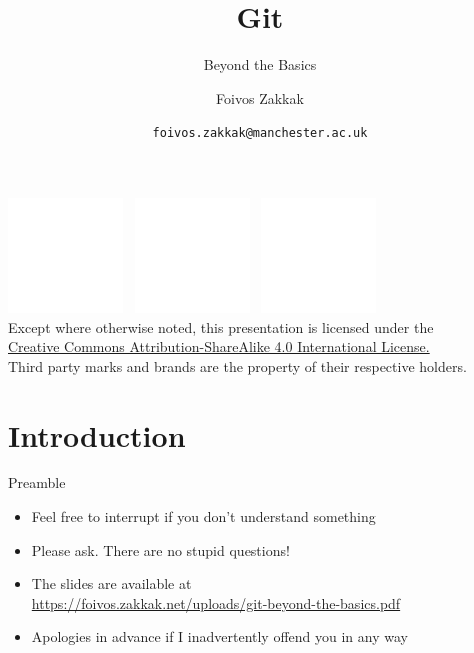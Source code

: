 \documentclass[
14pt,
aspectratio=169,
usenames,
dvipsnames,
x11names]{beamer}
\title[Git: Beyond the Basics]{Git}
\subtitle{Beyond the Basics}
\author[\texttt{foivos.zakkak@manchester.ac.uk}]{Foivos Zakkak}
\date{\texttt{foivos.zakkak@manchester.ac.uk}}
\begin{document}


\begin{frame}[plain]
  \titlepage
  \centering
  \includegraphics[height=.75cm]{cc}~
  \includegraphics[height=.75cm]{by}~
  \includegraphics[height=.75cm]{sa}\\[1em]
  \scriptsize{Except where otherwise noted, this presentation is licensed under the\\
    \href{http://creativecommons.org/licenses/by-nc-sa/4.0/}%
    {Creative Commons Attribution-ShareAlike 4.0 International License.}\\[1ex]
    Third party marks and brands are the property of their respective
    holders.}
\end{frame}


\section{Introduction}

\begin{frame}{Preamble}
  \begin{itemize} \setlength{\itemsep}{\fill}
  \item Feel free to \alert{interrupt} if you don't understand something
  \item Please ask. \alert{There are no stupid questions}!
  \item The slides are available at\\ {\small\url{https://foivos.zakkak.net/uploads/git-beyond-the-basics.pdf}}
  \item %
    Apologies in advance if I \alert{inadvertently} offend you in any way
  \end{itemize}
\end{frame}
\end{document}
